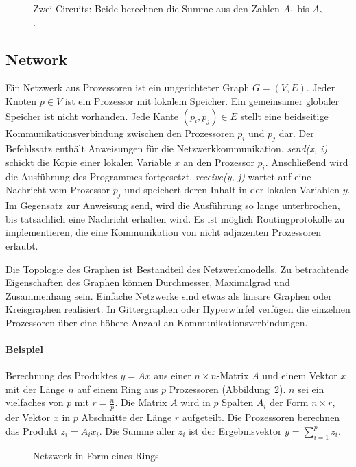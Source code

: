 \begin{figure}
    \centering
    
    \caption{
        Zwei Circuits: Beide berechnen die Summe aus den Zahlen $A_1$ bis $A_8$.
        \cite[S.8]{jaja}
    }
    \label{fig:circuit}
\end{figure}

\subsection{Network}
Ein Netzwerk aus Prozessoren ist ein ungerichteter Graph $G = (V,E)$.
Jeder Knoten $p \in V$ ist ein Prozessor mit lokalem Speicher. Ein gemeinsamer
globaler Speicher ist nicht vorhanden.
Jede Kante $(p_i, p_j) \in E$ stellt eine beidseitige Kommunikationsverbindung
zwischen den Prozessoren $p_i$ und $p_j$ dar.
Der Befehlssatz enthält Anweisungen für die Netzwerkkommunikation.
\emph{send(x, i)} schickt die Kopie einer lokalen Variable $x$ an den Prozessor
$p_i$.
Anschließend wird die Ausführung des Programmes fortgesetzt.
\emph{receive(y, j)} wartet auf eine Nachricht vom Prozessor $p_j$ und speichert
deren Inhalt in der lokalen Variablen $y$.
Im Gegensatz zur Anweisung send, wird die Ausführung so lange unterbrochen, bis
tatsächlich eine Nachricht erhalten wird.
Es ist möglich Routingprotokolle zu implementieren, die eine Kommunikation von
nicht adjazenten Prozessoren erlaubt.

Die Topologie des Graphen ist Bestandteil des Netzwerkmodells.
Zu betrachtende Eigenschaften des Graphen können Durchmesser, Maximalgrad und
Zusammenhang sein.
Einfache Netzwerke sind etwas als lineare Graphen oder Kreisgraphen realisiert.
In Gittergraphen oder Hyperwürfel verfügen die einzelnen Prozessoren über eine
höhere Anzahl an Kommunikationsverbindungen.
\cite[S.16f.]{jaja}

\paragraph{Beispiel}
Berechnung des Produktes $y = Ax$ aus einer $n \times n$-Matrix $A$ und einem
Vektor $x$ mit der Länge $n$ auf einem Ring aus $p$ Prozessoren
(Abbildung~\ref{fig:ring}).
$n$ sei ein vielfaches von $p$ mit $r = \frac{n}{p}$.
Die Matrix $A$ wird in $p$ Spalten $A_i$ der Form $n \times r$,
der Vektor $x$ in $p$ Abschnitte der Länge $r$ aufgeteilt.
Die Prozessoren berechnen das Produkt $z_i = A_ix_i$.
Die Summe aller $z_i$ ist der Ergebnisvektor $y = \sum_{i=1}^p z_i$.

\begin{figure}
    \centering
    
    \caption{Netzwerk in Form eines Rings}
    \label{fig:ring}
\end{figure}


